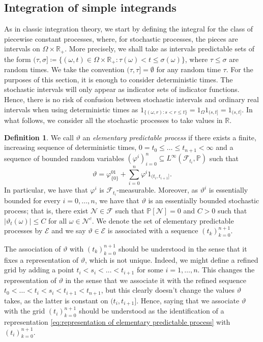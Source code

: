 \documentclass[11pt,a4paper,twoside,openany]{report}
\numberwithin{equation}{section}
\theoremstyle{plain} %
\theoremstyle{definition} %
\newtheorem{definition}[theorem]{Definition}
\theoremstyle{remark} %
\begin{document}
\subsection{Integration of simple integrands}
As in classic integration theory, we start by defining the integral for the class of piecewise constant processes, where, for stochastic processes, the pieces are intervals on \(\Omega\times\mathbb{R}_+\). More precisely, we shall take as intervals predictable sets of the form \((\tau,\sigma]\coloneqq \{(\omega,t)\in\Omega\times\mathbb{R}_+:\tau(\omega)< t\leq\sigma(\omega)\}\), where \(\tau\leq\sigma\) are random times. We take the convention \((\tau,\tau]=\emptyset\) for any random time \(\tau\). For the purposes of this section, it is enough to consider deterministic times. The stochastic intervals will only appear as indicator sets of indicator functions. Hence, there is no risk of confusion between stochastic intervals and ordinary real intervals when using deterministic times as \(1_{\{(\omega,r):s<r\leq t\}}=1_{\Omega}1_{(s,t]}=1_{(s,t]}\). In what follows, we consider all the stochastic processes to take values in \(\mathbb{R}\).

\begin{definition}\label{def:elementary predictable process}
    We call \(\vartheta\) an \textit{elementary predictable process} if there exists a finite, increasing sequence of deterministic times, \(0=t_0\leq\dots\leq t_{n+1}<\infty\) and a sequence of bounded random variables \((\varphi^i)_{i=0}^n\subseteq L^{\infty}(\mathcal{F}_{t_i},\mathbb{P})\) such that 
    \begin{equation}\label{eq:representation of elementary predictable process}
        \vartheta = \varphi^01_{\{0\}}+\sum_{i=0}^n\varphi^i1_{(t_i,t_{i+1}]}.
    \end{equation}
In particular, we have that \(\varphi^i\) is \(\mathcal{F}_{t_i}\)-measurable. Moreover, as \(\vartheta^i\) is essentially bounded for every \(i=0,\dots,n\), we have that \(\vartheta\) is an essentially bounded stochastic process; that is, there exist \(\mathcal{N}\in\mathcal{F}\) such that \(\mathbb{P}[\mathcal{N}]=0\) and \(C>0\) such that \(|\vartheta_t(\omega)|\leq C\) for all \(\omega\in \mathcal{N}^c\).  We denote the set of elementary predictable processes by \(\mathcal{E}\) and we say \(\vartheta\in\mathcal{E}\) is associated with a sequence \((t_k)_{k=0}^{n+1}\).
\end{definition}
The association of \(\vartheta\) with \((t_k)_{k=0}^{n+1}\) should be understood in the sense that it fixes a representation of \(\vartheta\), which is not unique. Indeed, we might define a refined grid by adding a point \(t_i<s_i<\dots<t_{i+1}\) for some \(i=1,\dots,n\). This changes the representation of \(\vartheta\) in the sense that we associate it with the refined sequence \(t_0<\dots<t_i<s_i<t_{i+1}<t_{n+1}\), but this clearly doesn't change the values \(\vartheta\) takes, as the latter is constant on \((t_i,t_{i+1}]\). Hence, saying that we associate \(\vartheta\) with the grid \((t_i)_{k=0}^{n+1}\) should be understood as the identification of a representation \eqref{eq:representation of elementary predictable process} with \((t_i)_{k=0}^{n+1}\).
\end{document}
